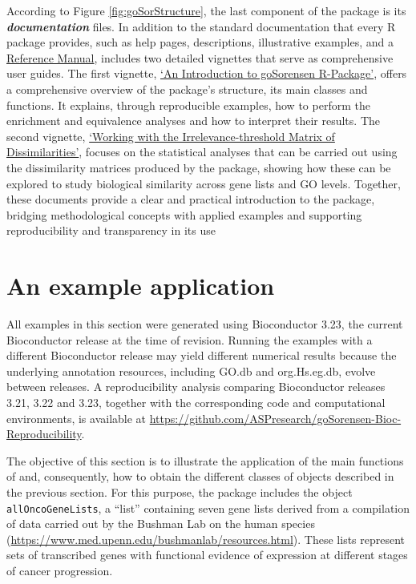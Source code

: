 According to Figure \ref{fig:goSorStructure}, the last component of the  package is its \textbf{\emph{documentation}} files. In addition to the standard documentation that every R package provides, such as help pages, descriptions, illustrative examples, and a \href{https://www.bioconductor.org/packages/release/bioc/manuals/goSorensen/man/goSorensen.pdf}{Reference Manual},  includes two detailed vignettes that serve as comprehensive user guides. The first vignette, \href{https://www.bioconductor.org/packages/release/bioc/vignettes/goSorensen/inst/doc/goSorensen_Introduction.html}{`An Introduction to goSorensen R-Package'}, offers a comprehensive overview of the package's structure, its main classes and functions. It explains, through reproducible examples, how to perform the enrichment and equivalence analyses and how to interpret their results. The second vignette, \href{https://www.bioconductor.org/packages/release/bioc/vignettes/goSorensen/inst/doc/Dissimilarities_Matrix.html}{`Working with the Irrelevance-threshold Matrix of Dissimilarities'}, focuses on the statistical analyses that can be carried out using the dissimilarity matrices produced by the package, showing how these can be explored to study biological similarity across gene lists and GO levels. Together, these documents provide a clear and practical introduction to the package, bridging methodological concepts with applied examples and supporting reproducibility and transparency in its use

\hypertarget{an-example-application}{%
\section{An example application}\label{an-example-application}}

All examples in this section were generated using Bioconductor 3.23, the current Bioconductor release at the time of revision. Running the examples with a different Bioconductor release may yield different numerical results because the underlying annotation resources, including GO.db and org.Hs.eg.db, evolve between releases. A reproducibility analysis comparing Bioconductor releases 3.21, 3.22 and 3.23, together with the corresponding code and computational environments, is available at \url{https://github.com/ASPresearch/goSorensen-Bioc-Reproducibility}.

The objective of this section is to illustrate the application of the main functions of  and, consequently, how to obtain the different classes of objects described in the previous section. For this purpose, the package includes the object \texttt{allOncoGeneLists}, a ``list'' containing seven gene lists derived from a compilation of data carried out by the Bushman Lab on the human species (\url{https://www.med.upenn.edu/bushmanlab/resources.html}). These lists represent sets of transcribed genes with functional evidence of expression at different stages of cancer progression.


